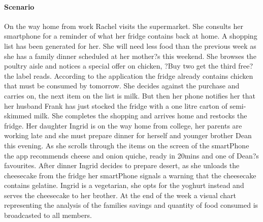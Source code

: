 \documentclass[a4paper, 11pt]{article}
\begin{document}
{\paragraph{Scenario}On the way home from work Rachel visits the supermarket. She consults her smartphone for a reminder of what her fridge contains back at home. A shopping list has been generated for her. She will need less food than the previous week as she has a family dinner scheduled at her mother?s this weekend. She browses the poultry aisle and notices a special offer on chicken, ?Buy two get the third free? the label reads. According to the application the fridge already contains chicken that must be consumed by tomorrow. She decides against the purchase and carries on, the next item on the list is milk. But then her phone notifies her that her husband Frank has just stocked the fridge with a one litre carton of semi-skimmed milk. She completes the shopping and arrives home and restocks the fridge. Her daughter Ingrid is on the way home from college, her parents are working late and she must prepare dinner for herself and younger brother Dean this evening. As she scrolls through the items on the screen of the smartPhone the app recommends cheese and onion quiche, ready in 20mins and one of Dean?s favourites. After dinner Ingrid decides to prepare desert, as she unloads the cheesecake from the fridge her smartPhone signals a warning that the cheesecake contains gelatine. Ingrid is a vegetarian, she opts for the yoghurt instead and serves the cheesecake to her brother. At the end of the week a visual chart representing the analysis of the families savings and quantity of food consumed is broadcasted to all members.


}
\end{document}
